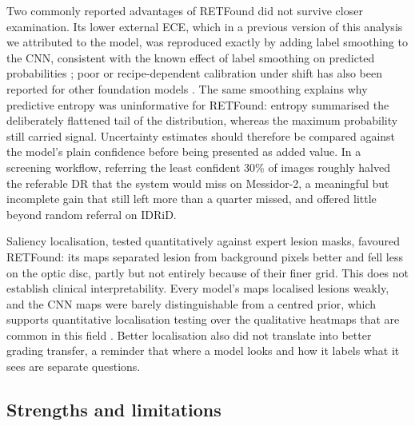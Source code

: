 \documentclass[pdflatex,sn-basic,Numbered]{sn-jnl}
\begin{document}
Two commonly reported advantages of RETFound did not survive closer examination. Its lower external ECE, which in a previous version of this analysis we attributed to the model, was reproduced exactly by adding label smoothing to the CNN, consistent with the known effect of label smoothing on predicted probabilities \cite{muller2019labelsmoothing}; poor or recipe-dependent calibration under shift has also been reported for other foundation models \cite{li2026uwf,poyrazer2026}. The same smoothing explains why predictive entropy was uninformative for RETFound: entropy summarised the deliberately flattened tail of the distribution, whereas the maximum probability still carried signal. Uncertainty estimates should therefore be compared against the model's plain confidence before being presented as added value. In a screening workflow, referring the least confident 30\% of images roughly halved the referable DR that the system would miss on Messidor-2, a meaningful but incomplete gain that still left more than a quarter missed, and offered little beyond random referral on IDRiD.

Saliency localisation, tested quantitatively against expert lesion masks, favoured RETFound: its maps separated lesion from background pixels better and fell less on the optic disc, partly but not entirely because of their finer grid. This does not establish clinical interpretability. Every model's maps localised lesions weakly, and the CNN maps were barely distinguishable from a centred prior, which supports quantitative localisation testing over the qualitative heatmaps that are common in this field \cite{mahapadi2025,alizadeh2024}. Better localisation also did not translate into better grading transfer, a reminder that where a model looks and how it labels what it sees are separate questions.

\subsection*{Strengths and limitations}
\end{document}
